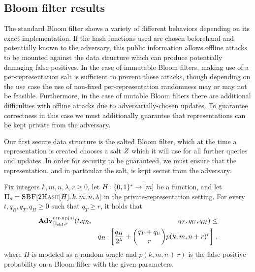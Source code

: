 \subsection{Bloom filter results}
\label{subsec:bloom-filters}



The standard Bloom filter shows a variety of different behaviors depending on its exact implementation. If the hash functions used are chosen beforehand and potentially known to the adversary, this public information allows offline attacks to be mounted against the data structure which can produce potentially damaging false positives. In the case of immutable Bloom filters, making use of a per-representation salt is sufficient to prevent these attacks, though depending on the use case the use of non-fixed per-representation randomness may or may not be feasible. Furthermore, in the case of mutable Bloom filters there are additional difficulties with offline attacks due to adversarially-chosen updates. To guarantee correctness in this case we must additionally guarantee that representations can be kept private from the adversary.

Our first secure data structure is the salted Bloom filter, which at the time a representation is created chooses a salt $Z$ which it will use for all further queries and updates. In order for security to be guaranteed, we must ensure that the representation, and in particular the salt, is kept secret from the adversary.

\begin{theorem}\label{thm:bf-priv-salt-bound}
Fix integers $k, m, n, \lambda, r\geq 0$, let $H \colon \{0,1\}^* \to [m]$ be a function, and let $\mathrm{\Pi}_s = \textsc{SBF}[\textsc{2Hash}[H],k,m,n,\lambda]$ in the private-representation setting.
  For every $t, q_R, q_T, q_H \geq 0$ such that $q_T \geq r$, it holds that
  \begin{eqnarray*}
    \Adv{\erreps}_{\struct_\saltybloom,r}(t,&q_R,& q_T, q_U, q_H) \leq \\ && q_R \cdot
     \left[
      \frac{q_H}{2^\lambda} +
      {\dbinom{q_T+q_U}{r}} p(k, m, n+r)^r
    \right] \,,
\end{eqnarray*}
where $H$ is modeled as a random oracle and $p(k, m, n+r)$ is the false-positive probability on a Bloom filter with the given parameters.
\end{theorem}

